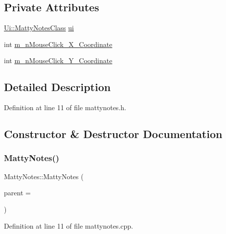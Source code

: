 \subsection*{Private Attributes}
\begin{DoxyCompactItemize}
\item 
\hyperlink{classUi_1_1MattyNotesClass}{Ui\+::\+Matty\+Notes\+Class} \hyperlink{classMattyNotes_aa697392317715f04e4bc011090bebdb5}{ui}
\item 
int \hyperlink{classMattyNotes_a9c2352149386cb95946e3a8526c1ad2c}{m\+\_\+n\+Mouse\+Click\+\_\+\+X\+\_\+\+Coordinate}
\item 
int \hyperlink{classMattyNotes_aa4b9e6a5553ad49e4389340a783a85b9}{m\+\_\+n\+Mouse\+Click\+\_\+\+Y\+\_\+\+Coordinate}
\end{DoxyCompactItemize}


\subsection{Detailed Description}


Definition at line 11 of file mattynotes.\+h.



\subsection{Constructor \& Destructor Documentation}
\hypertarget{classMattyNotes_aa81db851f82183700abb0b7cd1ba2299}{}\label{classMattyNotes_aa81db851f82183700abb0b7cd1ba2299} 
\subsubsection{\texorpdfstring{Matty\+Notes()}{MattyNotes()}}
{\footnotesize\ttfamily Matty\+Notes\+::\+Matty\+Notes (\begin{DoxyParamCaption}\item[{Q\+Widget $\ast$}]{parent = {} }\end{DoxyParamCaption})}



Definition at line 11 of file mattynotes.\+cpp.

